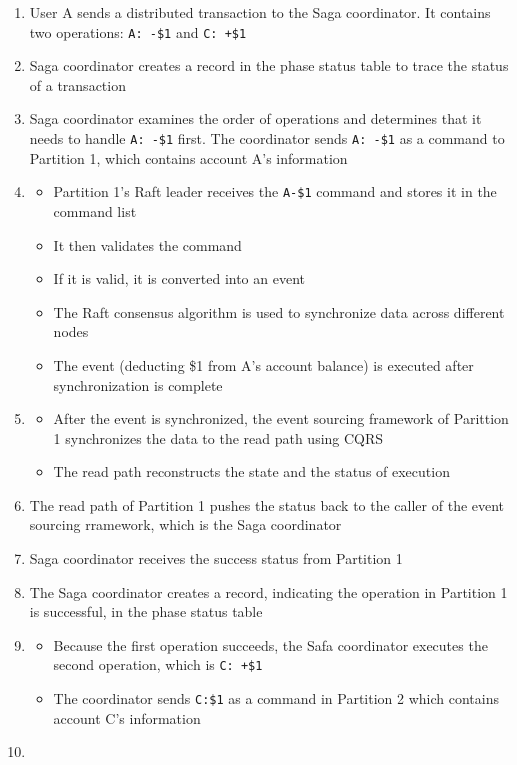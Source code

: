 \documentclass{report}
\theoremstyle{definition}
\begin{document}
\begin{enumerate}
\item
User A sends a distributed transaction to the Saga coordinator. It contains two operations: \lstinline|A: -$1| and \lstinline|C: +$1|
\item
Saga coordinator creates a record in the phase status table to trace the status of a transaction
\item
Saga coordinator examines the order of operations and determines that it needs to handle \lstinline|A: -$1| first. The coordinator sends \lstinline|A: -$1| as a command to Partition 1, which contains account A's information
\item

\begin{itemize}
\item
Partition 1's Raft leader receives the \lstinline|A-$1| command and stores it in the command list
\item
It then validates the command
\item
If it is valid, it is converted into an event
\item
The Raft consensus algorithm is used to synchronize data across different nodes
\item
The event (deducting \$1 from A's account balance) is executed after synchronization is complete
\end{itemize}

\item

\begin{itemize}
\item
After the event is synchronized, the event sourcing framework of Parittion 1 synchronizes the data to the read path using CQRS
\item
The read path reconstructs the state and the status of execution
\end{itemize}
\item
The read path of Partition 1 pushes the status back to the caller of the event sourcing rramework, which is the Saga coordinator
\item
Saga coordinator receives the success status from Partition 1
\item
The Saga coordinator creates a record, indicating the operation in Partition 1 is successful, in the phase status table
\item

\begin{itemize}
\item
Because the first operation succeeds, the Safa coordinator executes the second operation, which is \lstinline|C: +$1|
\item
The coordinator sends \lstinline|C:$1| as a command in Partition 2 which contains account C's information
\end{itemize}
\item


\end{enumerate}
\end{document}
